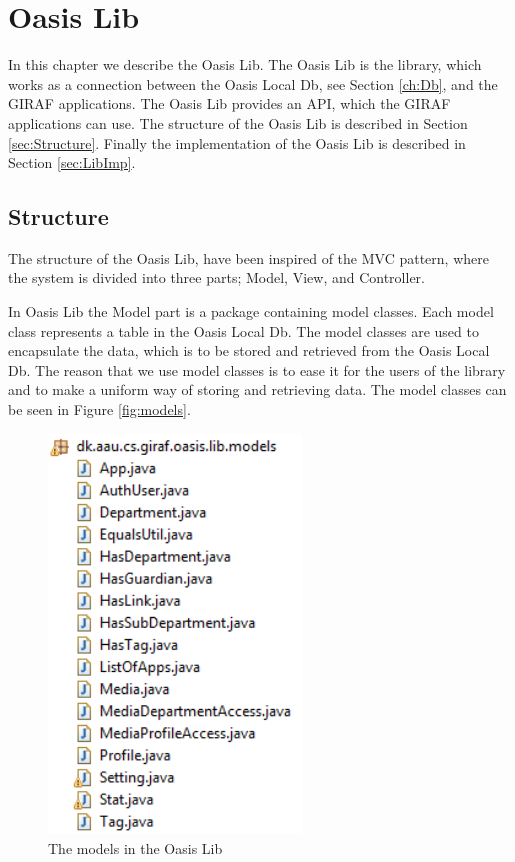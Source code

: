 \chapter{Oasis Lib}
\label{ch:Lib}
In this chapter we describe the Oasis Lib.
The Oasis Lib is the library, which works as a connection between the Oasis Local Db, see Section \vref{ch:Db}, and the GIRAF applications.
The Oasis Lib provides an API, which the GIRAF applications can use.
The structure of the Oasis Lib is described in Section \vref{sec:Structure}.
Finally the implementation of the Oasis Lib is described in Section \vref{sec:LibImp}.

\section{Structure}
\label{sec:Structure}
The structure of the Oasis Lib, have been inspired of the MVC pattern, where the system is divided into three parts; Model, View, and Controller. 

In Oasis Lib the Model part is a package containing model classes. Each model class represents a table in the Oasis Local Db.
The model classes are used to encapsulate the data, which is to be stored and retrieved from the Oasis Local Db.
The reason that we use model classes is to ease it for the users of the library and to make a uniform way of storing and retrieving data.
The model classes can be seen in Figure \vref{fig:models}.
\begin{figure}[H]
	\centering
		\includegraphics[width=0.6\textwidth]{images/models.png}
	\caption{The models in the Oasis Lib}
	\label{fig:models}
\end{figure}

